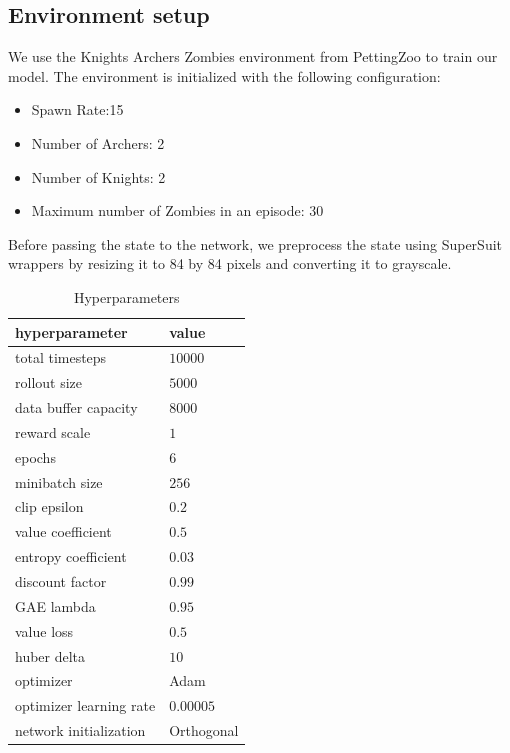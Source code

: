 \documentclass{article}
\begin{document}

\subsection{Environment setup}
We use the Knights Archers Zombies environment from PettingZoo to train our model. The environment is initialized with
the following configuration:
\begin{itemize}
  \item Spawn Rate:15
  \item Number of Archers: 2
  \item Number of Knights: 2
  \item Maximum number of Zombies in an episode: 30
\end{itemize}

Before passing the state to the network, we preprocess the state using SuperSuit \cite{SuperSuit} wrappers by resizing it to 84 by 84 pixels and
converting it to grayscale.


\begin{table}[h]
  \caption{Hyperparameters}
   \centering
   \begin{tabular}{ll}
     \toprule
     hyperparameter     & value     \\
     \midrule
     total timesteps & $10000$ \\
     rollout size & $5000$ \\
     data buffer capacity & $8000$ \\
     reward scale & $1$ \\
     epochs & $6$ \\
     minibatch size & $256$ \\
     clip epsilon & $0.2$ \\
     value coefficient & $0.5$ \\
     entropy coefficient & $0.03$ \\
     discount factor & $0.99$ \\
     GAE lambda & $0.95$ \\
     value loss & $0.5$ \\
     huber delta & $10$ \\
     optimizer & Adam \\
     optimizer learning rate & $0.00005$ \\
     network initialization & Orthogonal \\
     \bottomrule
   \end{tabular}
   \label{tab:table}
 \end{table}
\end{document}
